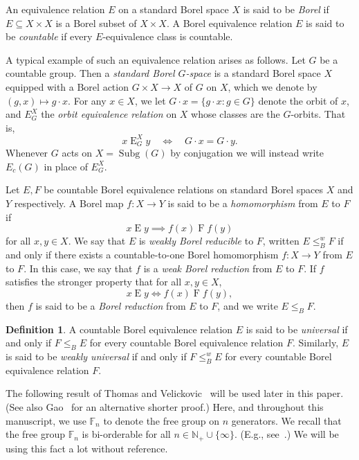 \documentclass{amsart}
\theoremstyle{definition}
\newtheorem{definition}[theorem]{Definition}
\theoremstyle{remark}
\DeclareMathOperator{\Subg}{Subg}
\begin{document}
An equivalence relation \(E\) on a standard Borel space \(X\) is said to be \emph{Borel} if \(E \subseteq X\times X\) is a Borel subset of \(X\times X\). A Borel equivalence relation \(E\) is said to be \emph{countable} if every \(E\)-equivalence class is countable. 

A typical example of such an equivalence relation arises as follows. Let \(G\) be a countable group. Then a \emph{standard Borel \(G\)-space} is a standard Borel space \(X\) equipped with a Borel action \(G\times X\to X \) of \(G\) on \(X\), which we denote by \( (g, x) \mapsto g \cdot x\).
For any \(x\in X\), we let \(G\cdot x =\{g\cdot x : g\in G\}\) denote the orbit of \(x\), and \(E^X_G\) the \emph{orbit equivalence relation} on \(X\) whose classes are the \(G\)-orbits.  That is,
\[
x\mathbin{E}^X_Gy\quad \iff\quad G\cdot x = G\cdot y.
\]
Whenever \(G\) acts on \(X = \Subg(G)\) by conjugation we will instead write \(E_c(G)\) in place of \( E^X_G\).


Let \(E, F\) be countable Borel equivalence relations on standard Borel spaces $X$ and $Y$ respectively. A Borel map \(f \colon X\to Y\) is said to be a \emph{homomorphism} from \(E\) to \(F\)  if 
\[x\mathbin{E} y \implies f(x)\mathbin{F} f(y)\]
for all \(x,y\in X\).  We say that \(E\) is \emph{weakly Borel reducible}
to \(F\), written \(E \leq^w_{B} F\) if and only if there exists a countable-to-one Borel homomorphism
\(f \colon X \to Y\) from \(E\) to \(F\). In this case, we say that \(f\) is a \emph{weak Borel reduction} from
\(E\) to \(F\).  If \(f\) satisfies the stronger property that for all \(x, y \in X\),
\[x\mathbin{E}y \iff f(x)\mathbin{F}f(y),\]
then \(f\) is said to be a \emph{Borel reduction} from \(E\) to \(F\), and we write \(E \leq_B F\). 

\begin{definition}
A countable Borel equivalence relation \(E\) is said to be
\emph{universal} if and only if \(F \leq_B
 E\) for every countable Borel equivalence relation \(F\). Similarly, \(E\) is said to be \emph{weakly
universal} if and only if \(F \leq^w_B E\) for every countable Borel equivalence relation \(F\).
\end{definition}


The following result of Thomas and Velickovic~\cite[Theorem~7]{ThoVel}  will be used later in this paper. (See also Gao~\cite[Theorem~2]{Gao00} for an alternative shorter proof.) Here, and throughout this manuscript, we use $\mathbb{F}_n$ to denote the free group on $n$ generators. We recall that the free group \(\mathbb{F}_n\) is bi-orderable for all \(n\in \mathbb{N}_+\cup \{\infty\}\). (E.g., see~\cite[Theorem~3.4]{ClaRol}.) We will be using this fact a lot without reference.
\end{document}
